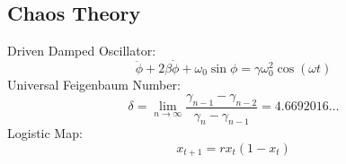\subsection{Chaos Theory}
Driven Damped Oscillator:
\begin{equation}
    \ddot{\phi} + 2\beta\dot{\phi} + \omega_0\sin\phi = \gamma\omega_0^2\cos(\omega t)
\end{equation}
Universal Feigenbaum Number:
\begin{equation}
    \delta = \lim_{n \rightarrow \infty}\frac{\gamma_{n-1} - \gamma_{n-2}}{\gamma_n - \gamma_{n-1}} = 4.6692016\ldots
\end{equation}
Logistic Map:
\begin{equation}
    x_{t+1} = rx_{t}(1-x_t)
\end{equation}